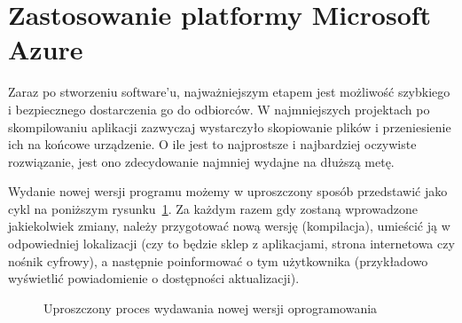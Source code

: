 \section{Zastosowanie platformy Microsoft Azure}


Zaraz po stworzeniu software'u, najważniejszym etapem jest możliwość szybkiego i bezpiecznego dostarczenia go do odbiorców.
W najmniejszych projektach po skompilowaniu aplikacji zazwyczaj wystarczyło skopiowanie plików
i przeniesienie ich na końcowe urządzenie. O ile jest to najprostsze i najbardziej oczywiste rozwiązanie,
jest ono zdecydowanie najmniej wydajne na dłuższą metę.

Wydanie nowej wersji programu możemy w uproszczony sposób przedstawić jako cykl na poniższym rysunku~\ref{fig:cyklZmian}.
Za każdym razem gdy zostaną wprowadzone jakiekolwiek zmiany, należy przygotować nową wersję (kompilacja),
umieścić ją w odpowiedniej lokalizacji (czy to będzie sklep z aplikacjami, strona internetowa czy nośnik cyfrowy),
a następnie poinformować o tym użytkownika (przykładowo wyświetlić powiadomienie o dostępności aktualizacji).


\begin{figure}[!htp]
    \centering
    \caption{Uproszczony proces wydawania nowej wersji oprogramowania}
    \label{fig:cyklZmian}
\end{figure}

